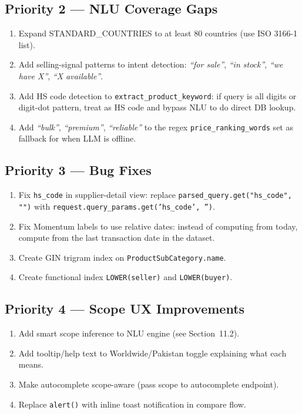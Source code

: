 \documentclass[12pt,a4paper]{article}
\begin{document}
\subsection{Priority 2 --- NLU Coverage Gaps}

\begin{enumerate}
  \item Expand STANDARD\_COUNTRIES to at least 80 countries (use ISO 3166-1 list).
  \item Add selling-signal patterns to intent detection: \textit{``for sale''}, \textit{``in stock''},
        \textit{``we have X''}, \textit{``X available''}.
  \item Add HS code detection to \texttt{extract\_product\_keyword}: if query is all digits
        or digit-dot pattern, treat as HS code and bypass NLU to do direct DB lookup.
  \item Add \textit{``bulk''}, \textit{``premium''}, \textit{``reliable''} to the regex
        \texttt{price\_ranking\_words} set as fallback for when LLM is offline.
\end{enumerate}

\subsection{Priority 3 --- Bug Fixes}

\begin{enumerate}
  \item Fix \texttt{hs\_code} in supplier-detail view: replace
        \texttt{parsed\_query.get("hs\_code", "")} with
        \texttt{request.query\_params.get('hs\_code', '')}.
  \item Fix Momentum labels to use relative dates: instead of computing from today,
        compute from the last transaction date in the dataset.
  \item Create GIN trigram index on \texttt{ProductSubCategory.name}.
  \item Create functional index \texttt{LOWER(seller)} and \texttt{LOWER(buyer)}.
\end{enumerate}

\subsection{Priority 4 --- Scope UX Improvements}

\begin{enumerate}
  \item Add smart scope inference to NLU engine (see Section~11.2).
  \item Add tooltip/help text to Worldwide/Pakistan toggle explaining what each means.
  \item Make autocomplete scope-aware (pass scope to autocomplete endpoint).
  \item Replace \texttt{alert()} with inline toast notification in compare flow.
\end{enumerate}
\end{document}
